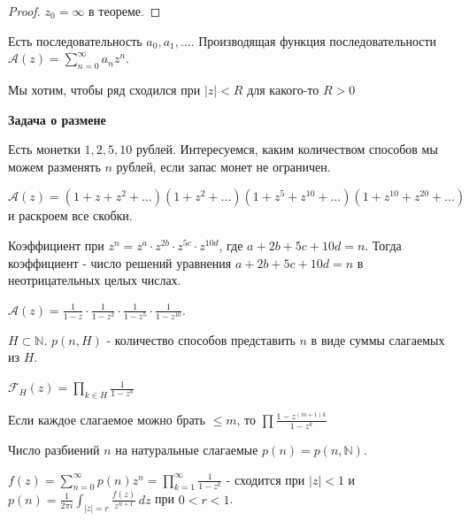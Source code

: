 \begin{proof}
    $z_0 = \infty$ в теореме.
\end{proof}


\begin{definition}
    Есть последовательность $a_0, a_1, \ldots$. Производящая функция последовательности
    $\mathcal{A}(z) = \sum_{n = 0}^{\infty} a_nz^n$.

    Мы хотим, чтобы ряд сходился при $|z| < R$ для какого-то $R > 0$
\end{definition}

\begin{example}
    \textbf{Задача о размене}

    Есть монетки $1, 2, 5, 10$ рублей. Интересуемся, каким количеством способов мы 
    можем разменять $n$ рублей, если запас монет не ограничен.

    $\mathcal{A}(z) = (1 + z + z^2 + \ldots)(1 + z^2 + \ldots)(1 + z^5 + z^{10} + \ldots)(1 + z^{10} + z^{20} + \ldots)$ и 
    раскроем все скобки.

    Коэффициент при $z^n = z^a \cdot z^{2b} \cdot z^{5c} \cdot z^{10d}$, где $a + 2b + 5c + 10d = n$.
    Тогда коэффициент - число решений уравнения $a + 2b + 5c + 10d = n$ в неотрицательных целых числах.

    $\mathcal{A}(z) = \frac{1}{1 - z} \cdot \frac{1}{1 - z^2} \cdot \frac{1}{1 - z^5} \cdot \frac{1}{1 - z^{10}}$.
\end{example}

\begin{definition}
    $H \subset \mathbb{N}$. $p(n, H)$ - количество способов представить $n$ в виде суммы слагаемых из $H$.

    $\mathcal{F}_{H}(z) = \prod_{k \in H} \frac{1}{1 - z^k}$

    Если каждое слагаемое можно брать $\leqslant m$, то $\prod \frac{1 - z^{(m+1)k}}{1 - z^k}$
\end{definition}

\begin{definition}
    Число разбиений $n$ на натуральные слагаемые $p(n) = p(n, \mathbb{N})$.
\end{definition}

\begin{theorem}
    $f(z) = \sum_{n = 0}^{\infty} p(n) z^n = \prod_{k=1}^{\infty} \frac{1}{1 - z^k}$ - сходится при $|z| < 1$
    и $p(n) = \frac{1}{2\pi i} \int_{|z| = r} \frac{f(z)}{z^{n + 1}} \, dz$ при $0 < r < 1$.
\end{theorem}

